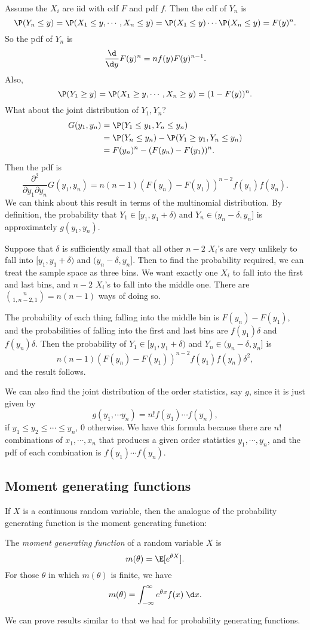 \documentclass[a4paper]{article}
\begin{document}
Assume the $X_i$ are iid with cdf $F$ and pdf $f$. Then the cdf of $Y_n$ is
\[
  \P(Y_n \leq y) = \P(X_1 \leq y, \cdots, X_n \leq y) = \P(X_1 \leq y)\cdots\P(X_n \leq y) = F(y)^n.
\]
So the pdf of $Y_n$ is
\[
  \frac{\d }{\d y}F(y)^n = nf(y)F(y)^{n - 1}.
\]
Also,
\[
  \P(Y_1 \geq y) = \P(X_1\geq y, \cdots, X_n \geq y) = (1 - F(y))^n.
\]
What about the joint distribution of $Y_1, Y_n$?
\begin{align*}
  G(y_1, y_n) &= \P(Y_1\leq y_1, Y_n \leq y_n)\\
  &= \P(Y_n \leq y_n) - \P(Y_1 \geq y_1 , Y_n \leq y_n)\\
  &= F(y_n)^n - (F(y_n) - F(y_1))^n.
\end{align*}
Then the pdf is
\[
  \frac{\partial^2}{\partial y_1 \partial y_n}G(y_1, y_n) = n(n - 1)(F(y_n) - F(y_1))^{n - 2}f(y_1)f(y_n).
\]
We can think about this result in terms of the multinomial distribution. By definition, the probability that $Y_1\in [y_1, y_1 + \delta)$ and $Y_n\in (y_n - \delta, y_n]$ is approximately $g(y_1, y_n)$.

Suppose that $\delta$ is sufficiently small that all other $n - 2$ $X_i$'s are very unlikely to fall into $[y_1, y_1 + \delta)$ and $(y_n - \delta, y_n]$. Then to find the probability required, we can treat the sample space as three bins. We want exactly one $X_i$ to fall into the first and last bins, and $n - 2$ $X_i$'s to fall into the middle one. There are $\binom{n}{1, n-2, 1} = n(n - 1)$ ways of doing so.

The probability of each thing falling into the middle bin is $F(y_n) - F(y_1)$, and the probabilities of falling into the first and last bins are $f(y_1)\delta$ and $f(y_n)\delta$. Then the probability of $Y_1\in [y_1, y_1 + \delta)$ and $Y_n\in (y_n - \delta, y_n]$ is
\[
  n(n - 1)(F(y_n) - F(y_1))^{n - 2} f(y_1)f(y_n)\delta^2,
\]
and the result follows.

We can also find the joint distribution of the order statistics, say $g$, since it is just given by
\[
  g(y_1, \cdots y_n) = n! f(y_1)\cdots f(y_n),
\]
if $y_1 \leq y_2\leq \cdots \leq y_n$, 0 otherwise. We have this formula because there are $n!$ combinations of $x_1, \cdots, x_n$ that produces a given order statistics $y_1, \cdots, y_n$, and the pdf of each combination is $f(y_1)\cdots f(y_n)$.

\subsection{Moment generating functions}
If $X$ is a continuous random variable, then the analogue of the probability generating function is the moment generating function:
\begin{defi}
  The \emph{moment generating function} of a random variable $X$ is
  \[
    m(\theta) = \E[e^{\theta X}].
  \]
  For those $\theta$ in which $m(\theta)$ is finite, we have
  \[
    m(\theta) = \int_{-\infty}^\infty e^{\theta x}f(x)\;\d x.
  \]
\end{defi}
We can prove results similar to that we had for probability generating functions.
\end{document}
